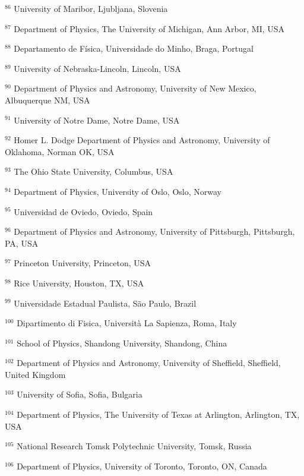 \par {\footnotesize $^{86}$ University of Maribor, Ljubljana, Slovenia}
\par {\footnotesize $^{87}$ Department of Physics, The University of Michigan, Ann Arbor, MI, USA}
\par {\footnotesize $^{88}$ Departamento de Física, Universidade do Minho, Braga, Portugal}
\par {\footnotesize $^{89}$ University of Nebraska-Lincoln, Lincoln, USA}
\par {\footnotesize $^{90}$ Department of Physics and Astronomy, University of New Mexico, Albuquerque NM, USA}
\par {\footnotesize $^{91}$ University of Notre Dame, Notre Dame, USA}
\par {\footnotesize $^{92}$ Homer L. Dodge Department of Physics and Astronomy, University of Oklahoma, Norman OK, USA}
\par {\footnotesize $^{93}$ The Ohio State University, Columbus, USA}
\par {\footnotesize $^{94}$ Department of Physics, University of Oslo, Oslo, Norway}
\par {\footnotesize $^{95}$ Universidad de Oviedo, Oviedo, Spain}
\par {\footnotesize $^{96}$ Department of Physics and Astronomy, University of Pittsburgh, Pittsburgh, PA, USA}
\par {\footnotesize $^{97}$ Princeton University, Princeton, USA}
\par {\footnotesize $^{98}$ Rice University, Houston, TX, USA}
\par {\footnotesize $^{99}$ Universidade Estadual Paulista, São Paulo, Brazil}
\par {\footnotesize $^{100}$ Dipartimento di Fisica, Università La Sapienza, Roma, Italy}
\par {\footnotesize $^{101}$ School of Physics, Shandong University, Shandong, China}
\par {\footnotesize $^{102}$ Department of Physics and Astronomy, University of Sheffield, Sheffield, United Kingdom}
\par {\footnotesize $^{103}$ University of Sofia, Sofia, Bulgaria}
\par {\footnotesize $^{104}$ Department of Physics, The University of Texas at Arlington, Arlington, TX, USA}
\par {\footnotesize $^{105}$ National Research Tomsk Polytechnic University, Tomsk, Russia}
\par {\footnotesize $^{106}$ Department of Physics, University of Toronto, Toronto, ON, Canada}
